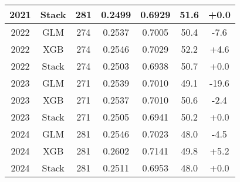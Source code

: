 \begin{table}[t]
\begin{tabular}{@{} c c c c c c c @{} }
    2021 & Stack & 281 & 0.2499 & 0.6929 & 51.6 & +0.0 \\
    \midrule
    2022 & GLM & 274 & 0.2537 & 0.7005 & 50.4 & -7.6 \\
    2022 & XGB & 274 & 0.2546 & 0.7029 & 52.2 & +4.6 \\
    2022 & Stack & 274 & 0.2503 & 0.6938 & 50.7 & +0.0 \\
    \midrule
    2023 & GLM & 271 & 0.2539 & 0.7010 & 49.1 & -19.6 \\
    2023 & XGB & 271 & 0.2537 & 0.7010 & 50.6 & -2.4 \\
    2023 & Stack & 271 & 0.2505 & 0.6941 & 50.2 & +0.0 \\
    \midrule
    2024 & GLM & 281 & 0.2546 & 0.7023 & 48.0 & -4.5 \\
    2024 & XGB & 281 & 0.2602 & 0.7141 & 49.8 & +5.2 \\
    2024 & Stack & 281 & 0.2511 & 0.6953 & 48.0 & +0.0 \\
    \bottomrule
  \end{tabular}
\end{table}
